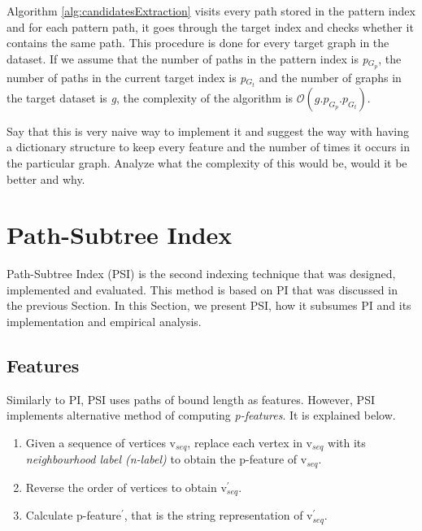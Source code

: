 \documentclass{l4proj}
\begin{document}
Algorithm \ref{alg:candidatesExtraction} visits every path stored in the pattern index and for each pattern path, it goes through the target index and checks whether it contains the same path. This procedure is done for every target graph in the dataset. If we assume that the number of paths in the pattern index is \emph{p$_{G_{p}}$}, the number of paths in the current target index is \emph{p$_{G_{t}}$} and the number of graphs in the target dataset is \emph{g}, the complexity of the algorithm is $\mathcal{O}(g.p_{G_{p}}.p_{G_{t}})$.

Say that this is very naive way to implement it and suggest the way with having a dictionary structure to keep every feature and the number of times it occurs in the particular graph. Analyze what the complexity of this would be, would it be better and why.

\section{Path-Subtree Index}
\label{path-subtree-index}
  Path-Subtree Index (PSI) is the second indexing technique that was designed, implemented and evaluated. This method is based on PI that was discussed in the previous Section. In this Section, we present PSI, how it subsumes PI and its implementation and empirical analysis.

\subsection{Features}
Similarly to PI, PSI uses paths of bound length as features. However, PSI implements alternative method of computing \textit{p-features}. It is explained below.

\begin{enumerate}
\item Given a sequence of vertices v$_{seq}$, replace each vertex in v$_{seq}$ with its \emph{neighbourhood label (n-label)} to obtain the p-feature of v$_{seq}$.
\item Reverse the order of vertices to obtain v$_{seq}^{\prime}$.
\item Calculate p-feature$^{\prime}$, that is the string representation of v$_{seq}^{\prime}$. 
\end{enumerate}
\end{document}
